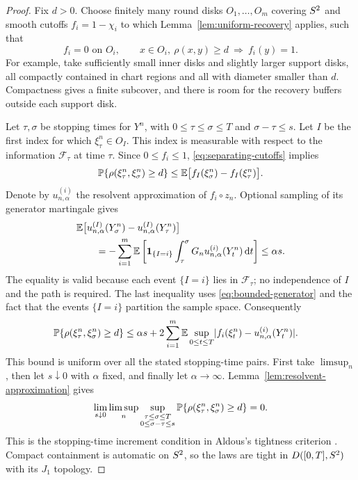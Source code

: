 \begin{proof}
Fix $d>0$. Choose finitely many round disks $O_1,\ldots,O_m$ covering
$S^2$ and smooth cutoffs $f_i=1-\chi_i$ to which
Lemma~\ref{lem:uniform-recovery} applies, such that
\begin{equation}\label{eq:separating-cutoffs}
 f_i=0\text{ on }O_i,
 \qquad x\in O_i,\ \rho(x,y)\ge d\ \Longrightarrow\ f_i(y)=1.
\end{equation}
For example, take sufficiently small inner disks and slightly larger
support disks, all compactly contained in chart regions and all with
diameter smaller than $d$. Compactness gives a finite subcover, and there is
room for the recovery buffers outside each support disk.

Let $\tau,\sigma$ be stopping times for $Y^n$, with
$0\le\tau\le\sigma\le T$ and $\sigma-\tau\le s$. Let $I$ be the first index
for which $\xi^n_\tau\in O_I$. This index is measurable with respect to the
information $\mathcal F_\tau$ at time $\tau$. Since $0\le f_i\le1$,
\eqref{eq:separating-cutoffs} implies
\[
 \mathbb P\{\rho(\xi^n_\tau,\xi^n_\sigma)\ge d\}
 \le\mathbb E\bigl[f_I(\xi^n_\sigma)-f_I(\xi^n_\tau)\bigr].
\]
Denote by $u^{(i)}_{n,\alpha}$ the resolvent approximation of $f_i\circ z_n$.
Optional sampling of its generator martingale gives
\begin{align*}
 &\mathbb E\bigl[u^{(I)}_{n,\alpha}(Y^n_\sigma)
                -u^{(I)}_{n,\alpha}(Y^n_\tau)\bigr]\\
 &\qquad=-\sum_{i=1}^m\mathbb E\left[
    \mathbf1_{\{I=i\}}\int_\tau^\sigma
                    G_nu^{(i)}_{n,\alpha}(Y^n_t)\,\mathrm d t\right]
 \le\alpha s.
\end{align*}
The equality is valid because each event $\{I=i\}$ lies in
$\mathcal F_\tau$; no independence of $I$ and the path is required.
The last inequality uses \eqref{eq:bounded-generator} and the fact that the
events $\{I=i\}$ partition the sample space. Consequently
\begin{align}
 \mathbb P\{\rho(\xi^n_\tau,\xi^n_\sigma)\ge d\}
 &\le\alpha s+2\sum_{i=1}^m
 \mathbb E\sup_{0\le t\le T}
   \lvert f_i(\xi^n_t)-u^{(i)}_{n,\alpha}(Y^n_t)\rvert.
 \label{eq:aldous-bound}
\end{align}
This bound is uniform over all the stated stopping-time pairs. First take
$\limsup_n$, then let $s\downarrow0$ with $\alpha$ fixed, and finally let
$\alpha\to\infty$. Lemma~\ref{lem:resolvent-approximation} gives
\[
 \lim_{s\downarrow0}\limsup_n
 \sup_{\substack{\tau\le\sigma\le T\\0\le\sigma-\tau\le s}}
 \mathbb P\{\rho(\xi^n_\tau,\xi^n_\sigma)\ge d\}=0.
\]
This is the stopping-time increment condition in Aldous's tightness
criterion \cite{Aldous1978}. Compact containment is automatic on $S^2$,
so the laws are tight in $D([0,T],S^2)$ with its $J_1$ topology.


\end{proof}
